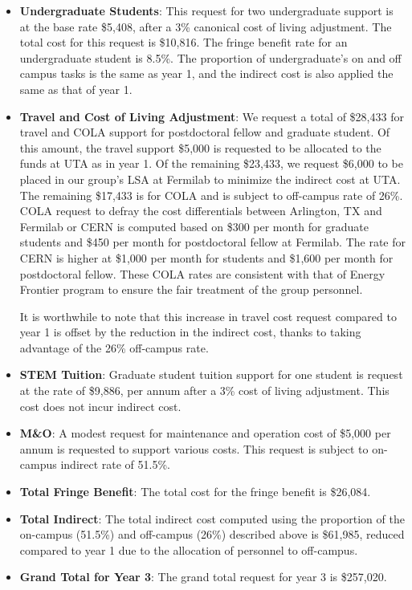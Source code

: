 \begin{enumerate}
\begin{itemize}
\item {{\bf Undergraduate Students}: This request for two undergraduate support is at the base rate \$5,408, after a 3\% canonical cost of living adjustment.  The total cost for this request is \$10,816.  The fringe benefit rate for an undergraduate student is 8.5\%.  The proportion of undergraduate’s on and off campus tasks is the same as year 1, and the indirect cost is also applied the same as that of year 1.}

\item{{\bf Travel and Cost of Living Adjustment}: We request a total of \$28,433 for travel and COLA support for postdoctoral fellow and graduate student.   Of this amount, the travel support \$5,000 is requested to be allocated to the funds at UTA as in year 1.  Of the remaining \$23,433, we request \$6,000 to be placed in our group’s LSA at Fermilab to minimize the indirect cost at UTA.   The remaining \$17,433 is for COLA and is subject to off-campus rate of 26\%.  COLA request to defray the cost differentials between Arlington, TX and Fermilab or CERN is computed based on \$300 per month for graduate students and \$450 per month for postdoctoral fellow at Fermilab.  The rate for CERN is higher at \$1,000 per month for students and \$1,600 per month for postdoctoral fellow.  These COLA rates are consistent with that of Energy Frontier program to ensure the fair treatment of the group personnel.  

It is worthwhile to note that this increase in travel cost request compared to year 1 is offset by the reduction in the indirect cost, thanks to taking advantage of the 26\% off-campus rate.}

\item {{\bf STEM Tuition}: Graduate student tuition support for one student is request at the rate of \$9,886, per annum after a 3\% cost of living adjustment.  This cost does not incur indirect cost.}

\item {{\bf M\&O}: A modest request for maintenance and operation cost of \$5,000 per annum is requested to support various costs.   This request is subject to on-campus indirect rate of 51.5\%.}

\item {{\bf Total Fringe Benefit}: The total cost for the fringe benefit is \$26,084.}

\item {{\bf Total Indirect}: The total indirect cost computed using the proportion of the on-campus (51.5\%) and off-campus (26\%) described above is \$61,985, reduced compared to year 1 due to the allocation of personnel to off-campus.}

\item {{\bf Grand Total for Year 3}: The grand total request for year 3 is \$257,020.}

\end{itemize}

\end{enumerate}
\newpage
